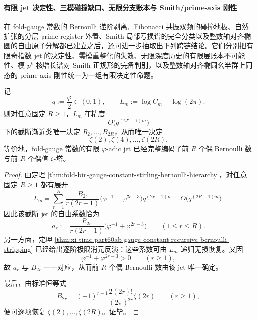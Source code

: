 \paragraph{有限 jet 决定性、三模碰撞缺口、无限分支账本与 Smith/prime-axis 刚性}
在 fold-gauge 常数的 Bernoulli 递阶剥离、Fibonacci 共振双频的碰撞地板、自然扩张的分层 prime-register 外置、Smith 局部亏损谱的完全分类以及整数轴对齐椭圆的自由原子分解都已建立之后，还可进一步抽取出下列跨链结论。它们分别把有限奇指数 jet 的决定性、零模重整化的失效、无限深度历史的有限层账本不可能性、模 \(p^k\) 核增长谱对 Smith 正规形的完备判别，以及整数轴对齐椭圆幺半群上同态的 prime-axis 刚性统一为一组有限决定性命题。

\begin{theorem}\label{thm:xi-time-part63b-logcm-phiadic-jet-determines-even-zeta}
记
\[
q:=\frac{\varphi}{2}\in(0,1),
\qquad
L_m:=\log C_m-\log(2\pi).
\]
则对任意固定 \(R\ge 1\)，\(L_m\) 在精度
\[
O\!\bigl(q^{(2R+1)m}\bigr)
\]
下的截断渐近类唯一决定 \(B_2,\dots,B_{2R}\)，从而唯一决定
\[
\zeta(2),\zeta(4),\dots,\zeta(2R).
\]
等价地，fold-gauge 常数的有限 \(\varphi\)-adic jet 已经完整编码了前 \(R\) 个偶 Bernoulli 数与前 \(R\) 个偶值 \(\zeta\)-塔。
\end{theorem}
\begin{proof}
由定理 \ref{thm:fold-bin-gauge-constant-stirling-bernoulli-hierarchy}，对任意固定 \(R\ge 1\) 都有展开
\[
L_m
=
\sum_{r=1}^{R}
\frac{B_{2r}}{r(2r-1)}
\bigl(\varphi^{-1}+\varphi^{2r-3}\bigr)q^{(2r-1)m}
+O\!\bigl(q^{(2R+1)m}\bigr).
\]
因此该截断 jet 的自由系数恰为
\[
a_r:=
\frac{B_{2r}}{r(2r-1)}
\bigl(\varphi^{-1}+\varphi^{2r-3}\bigr)
\qquad(1\le r\le R).
\]
另一方面，定理 \ref{thm:xi-time-part60ab-gauge-constant-recursive-bernoulli-stripping} 已经给出逐阶极限消元反演：这些系数可由 \(L_m\) 递归无损恢复。又因
\[
\varphi^{-1}+\varphi^{2r-3}>0
\qquad(r\ge 1),
\]
故 \(a_r\) 与 \(B_{2r}\) 一一对应，从而前 \(R\) 个偶 Bernoulli 数由该 jet 唯一确定。

最后，由标准恒等式
\[
B_{2r}
=
(-1)^{r-1}\frac{2(2r)!}{(2\pi)^{2r}}\zeta(2r)
\qquad(r\ge 1),
\]
便可逐项恢复 \(\zeta(2),\dots,\zeta(2R)\)。证毕。
\end{proof}

